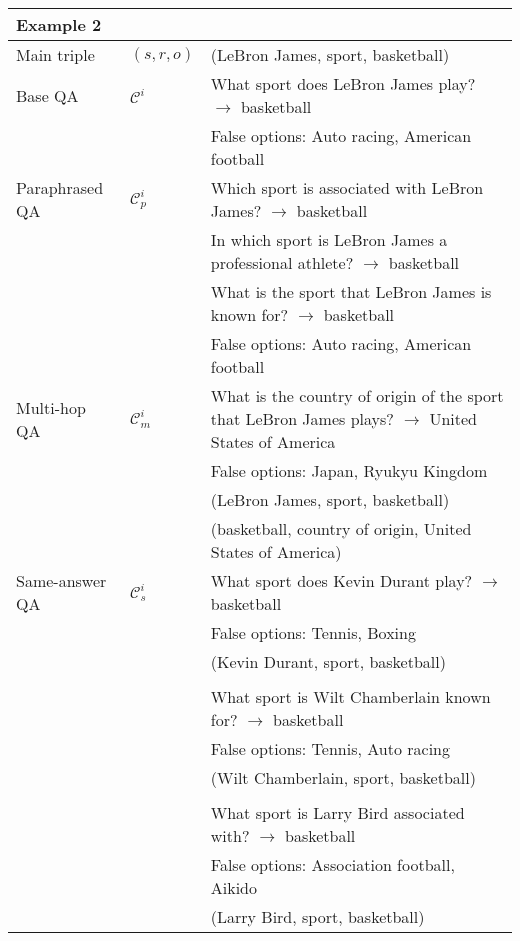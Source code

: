 \begin{table*}[t]
{\begin{tabular}{lll}
\rowcolor{gray!20} \textbf{Example 2} &  &  \\ \midrule
Main triple & \( (s,r,o) \)           & (LeBron James, sport, basketball)                                                                               \\ \midrule
Base QA & \( \mathcal{C}^{i} \)   & What sport does LeBron James play? \(\rightarrow\) basketball                                                   \\ 
& & False options: Auto racing, American football \\ \midrule
Paraphrased QA & \( \mathcal{C}_{p}^{i} \)  & Which sport is associated with LeBron James? \(\rightarrow\) basketball \\
& & In which sport is LeBron James a professional athlete? \(\rightarrow\) basketball \\
& & What is the sport that LeBron James is known for? \(\rightarrow\) basketball \\
& & False options: Auto racing, American football \\ \midrule
Multi-hop QA & \( \mathcal{C}_{m}^{i} \)   & What is the country of origin of the sport that LeBron James plays? \(\rightarrow\) United States of America \\ 
& & False options: Japan, Ryukyu Kingdom \\
                        & & (LeBron James, sport, basketball) \\ 
                        & & (basketball, country of origin, United States of America) \\ \midrule
Same-answer QA & \( \mathcal{C}_{s}^{i} \)   & What sport does Kevin Durant play? \(\rightarrow\) basketball                                                          \\ 
& & False options: Tennis, Boxing \\
& & (Kevin Durant, sport, basketball) \\ 
& & \\
& & What sport is Wilt Chamberlain known for? \(\rightarrow\) basketball \\
& & False options: Tennis, Auto racing \\
& & (Wilt Chamberlain, sport, basketball) \\ 
& & \\
& & What sport is Larry Bird associated with? \(\rightarrow\) basketball \\
& & False options: Association football, Aikido \\
& & (Larry Bird, sport, basketball) \\ \midrule


\end{tabular}}
\end{table*}
